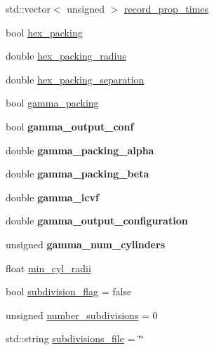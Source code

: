 \begin{DoxyCompactItemize}
std\+::vector$<$ unsigned $>$ \hyperlink{class_parameters_af47bd2eada81c6c581aaa8c70d04c8d6}{record\+\_\+prop\+\_\+times}
\item 
bool \hyperlink{class_parameters_aad79d8e720492fd880ee021c6320dfe0}{hex\+\_\+packing}
\item 
double \hyperlink{class_parameters_a3c49b55dc2a2af1c5ddfc3426e2a7936}{hex\+\_\+packing\+\_\+radius}
\item 
double \hyperlink{class_parameters_a480338071cedf966fdb79b37d9ebe656}{hex\+\_\+packing\+\_\+separation}
\item 
bool \hyperlink{class_parameters_aaef8b4218392fb19de2c5c886f5f7fa0}{gamma\+\_\+packing}
\item 
\mbox{\label{class_parameters_ae7568296f688ccea271336e882162e7e}} 
bool {\bfseries gamma\+\_\+output\+\_\+conf}
\item 
\mbox{\label{class_parameters_a29d423618cf9acb2bbfe071fac98ec29}} 
double {\bfseries gamma\+\_\+packing\+\_\+alpha}
\item 
\mbox{\label{class_parameters_a2b10c9b8191ca74923f07d74b8f7e30a}} 
double {\bfseries gamma\+\_\+packing\+\_\+beta}
\item 
\mbox{\label{class_parameters_a97df7bda4427bbdd7b7e0aa2cd23e858}} 
double {\bfseries gamma\+\_\+icvf}
\item 
\mbox{\label{class_parameters_a484419e6ab0c0661ff7825fbe6d5a963}} 
double {\bfseries gamma\+\_\+output\+\_\+configuration}
\item 
\mbox{\label{class_parameters_a6e8dfd894eef31a43bd7bb0de5f02f37}} 
unsigned {\bfseries gamma\+\_\+num\+\_\+cylinders}
\item 
float \hyperlink{class_parameters_a0b44e239201caecaebdb7e956ead1e0c}{min\+\_\+cyl\+\_\+radii}
\item 
bool \hyperlink{class_parameters_a43362cb6e3ea49cc9db9e52c3ebc7140}{subdivision\+\_\+flag} = false
\item 
unsigned \hyperlink{class_parameters_a0d15fd8f1f5c332174864c3acbaf5e10}{number\+\_\+subdivisions} = 0
\item 
std\+::string \hyperlink{class_parameters_a1733bfcb8391c494b7b1a317dfda5e44}{subdivisions\+\_\+file} = \char`\"{}\char`\"{}

\end{DoxyCompactItemize}
